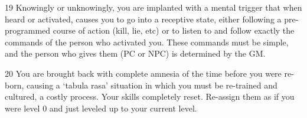                                                                                                                      


 19        Knowingly or unknowingly, you are implanted with a mental trigger that when heard or  
           activated, causes you to go into a receptive state, either following a pre-programmed course  
           of action (kill, lie, etc) or to listen to and follow exactly the commands of the person who  
           activated you. These commands must be simple, and the person who gives them (PC or NPC)  
           is determined by the GM.  

 20        You are brought back with complete amnesia of the time before you were re-born, causing a  
           ‘tabula rasa’ situation in which you must be re-trained and cultured, a costly process. Your  
           skills completely reset. Re-assign them as if you were level 0 and just leveled up to your  
           current level. 

                                                         